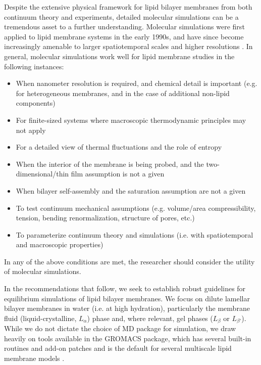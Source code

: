 \documentclass[9pt,bestpractices]{livecoms}
\begin{document}
Despite the extensive physical framework for lipid bilayer membranes from both continuum theory and experiments, detailed molecular simulations can be a tremendous asset to a further understanding.
Molecular simulations were first applied to lipid membrane systems in the early 1990s, and have since become increasingly amenable to larger spatiotemporal scales and higher resolutions \cite{Venable2015}.
In general, molecular simulations work well for lipid membrane studies in the following instances:
\begin{itemize}
	\item When nanometer resolution is required, and chemical detail is important (e.g. for heterogeneous membranes, and in the case of additional non-lipid components)
	\item For finite-sized systems where macroscopic thermodynamic principles may not apply
	\item For a detailed view of thermal fluctuations and the role of entropy
	\item When the interior of the membrane is being probed, and the two-dimensional/thin film assumption is not a given
	\item When bilayer self-assembly and the saturation assumption are not a given
	\item To test continuum mechanical assumptions (e.g. volume/area compressibility, tension, bending renormalization, structure of pores, etc.)
	\item To parameterize continuum theory and simulations (i.e. with spatiotemporal and macroscopic properties)
\end{itemize}

In any of the above conditions are met, the researcher should consider the utility of molecular simulations.

In the recommendations that follow, we seek to establish robust guidelines for equilibrium simulations of lipid bilayer membranes.
We focus on dilute lamellar bilayer membranes in water (i.e. at high hydration), particularly the membrane fluid (liquid-crystalline, $L_\alpha$) phase and, where relevant, gel phases ($L_\beta$ or $L_{\beta '}$).
While we do not dictate the choice of MD package for simulation, we draw heavily on tools available in the GROMACS package, which has several built-in routines and add-on patches \cite{Buchoux2017,Lukat2013,Truhlar2009a} and is the default for several multiscale lipid membrane models \cite{Poger2010a,Jambeck2012,Marrink2004,Marrink2007a,Arnarez2014}.
\end{document}
